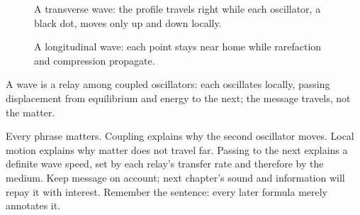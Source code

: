 \begin{figure}[htbp]
\centering
{}
\caption{A transverse wave: the profile travels right while each oscillator, a black dot, moves only up and down locally.}
\end{figure}

\begin{figure}[htbp]
\centering
{}
\caption{A longitudinal wave: each point stays near home while rarefaction and compression propagate.}
\end{figure}


\begin{oneline}
A wave is a relay among coupled oscillators: each oscillates locally, passing displacement from equilibrium and energy to the next; the message travels, not the matter.
\end{oneline}

\begin{mainline}
Every phrase matters. Coupling explains why the second oscillator moves. Local motion explains why matter does not travel far. Passing to the next explains a definite wave speed, set by each relay's transfer rate and therefore by the medium. Keep message on account; next chapter's sound and information will repay it with interest. Remember the sentence: every later formula merely annotates it.
\end{mainline}

